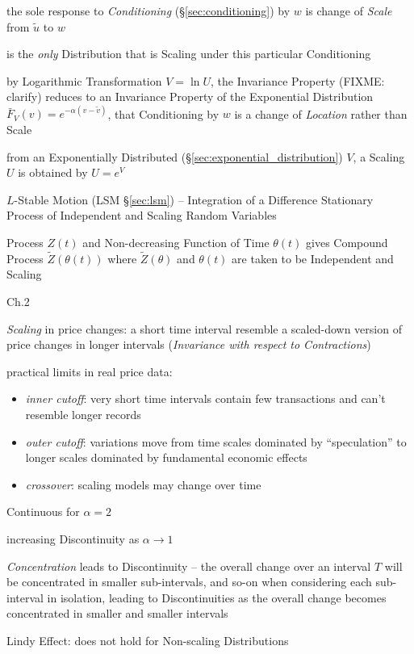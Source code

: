 the sole response to \emph{Conditioning} (\S\ref{sec:conditioning}) by $w$ is
change of \emph{Scale} from $\tilde{u}$ to $w$

is the \emph{only} Distribution that is Scaling under this particular
Conditioning

by Logarithmic Transformation $V = \ln U$, the Invariance Property (FIXME:
clarify) reduces to an Invariance Property of the Exponential Distribution
$\bar{F}_V(v) = e^{-\alpha(v - \tilde{v})}$, that Conditioning by $w$ is a
change of \emph{Location} rather than Scale

from an Exponentially Distributed (\S\ref{sec:exponential_distribution}) $V$, a
Scaling $U$ is obtained by $U = e^V$

\fist $L$-Stable Motion (LSM \S\ref{sec:lsm}) -- Integration of a Difference
Stationary Process of Independent and Scaling Random Variables

Process $Z(t)$ and Non-decreasing Function of Time $\theta(t)$ gives Compound
Process $\tilde{Z}(\theta(t))$ where $\tilde{Z}(\theta)$ and $\theta(t)$ are
taken to be Independent and Scaling

Ch.2

\emph{Scaling} in price changes: a short time interval resemble a scaled-down
version of price changes in longer intervals (\emph{Invariance with respect to
  Contractions})

practical limits in real price data:
\begin{itemize}
  \item \emph{inner cutoff}: very short time intervals contain few transactions
    and can't resemble longer records
  \item \emph{outer cutoff}: variations move from time scales dominated by
    ``speculation'' to longer scales dominated by fundamental economic effects
  \item \emph{crossover}: scaling models may change over time
\end{itemize}

Continuous for $\alpha = 2$

increasing Discontinuity as $\alpha \to 1$

\emph{Concentration} leads to Discontinuity -- the overall change over an
interval $T$ will be concentrated in smaller sub-intervals, and so-on when
considering each sub-interval in isolation, leading to Discontinuities as the
overall change becomes concentrated in smaller and smaller intervals

Lindy Effect: does not hold for Non-scaling Distributions

